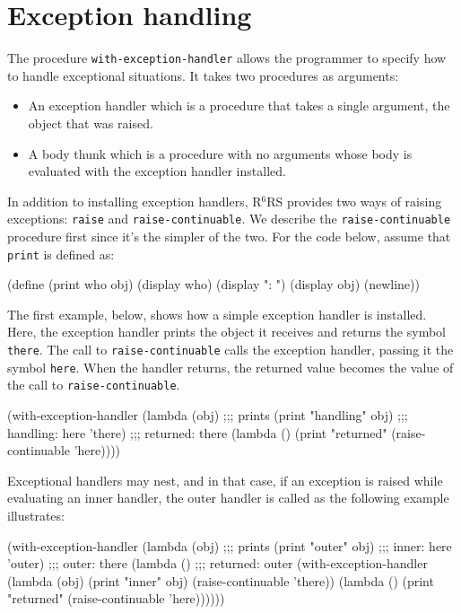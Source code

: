 \documentclass[onecolumn, 12pt, twoside, openright, dvipdfm]{book}
\newcommand{\rnrs}[1]{R$^{\mathrm{#1}}$RS}
\begin{document}
\section{Exception handling}

The procedure \texttt{with-exception-handler} allows the programmer
to specify how to handle exceptional situations.  It takes two
procedures as arguments: 
\begin{itemize}
\item An exception handler which is a procedure that takes a
single argument, the object that was raised.
\item A body thunk which is a procedure with no arguments whose body
is evaluated with the exception handler installed.
\end{itemize}

In addition to installing exception handlers, \rnrs{6} provides two
ways of raising exceptions: \texttt{raise} and
\texttt{raise-continuable}.  We describe the 
\texttt{raise-continuable} procedure
first since it's the simpler of the two.  
For the code below, assume that \texttt{print} is defined as:
\begin{CodeInline}
(define (print who obj)
  (display who) 
  (display ": ")
  (display obj)
  (newline))
\end{CodeInline}

The first example, below, shows how a simple exception handler is
installed.  Here, the exception handler prints the object it
receives and returns the symbol \texttt{there}.  The call to
\texttt{raise-continuable} calls the exception handler, passing it
the symbol \texttt{here}.  When the handler returns, the returned
value becomes the value of the call to \texttt{raise-continuable}.

\begin{CodeInline}
(with-exception-handler
  (lambda (obj)                         ;;; prints
    (print "handling" obj)              ;;;   handling: here
    'there)                             ;;;   returned: there
  (lambda ()
    (print "returned" (raise-continuable 'here))))
\end{CodeInline}

Exceptional handlers may nest, and in that case, if an exception is
raised while evaluating an inner handler, the outer handler is
called as the following example illustrates:

\begin{CodeInline}
(with-exception-handler
  (lambda (obj)                         ;;; prints
    (print "outer" obj)                 ;;;   inner: here    
    'outer)                             ;;;   outer: there   
  (lambda ()                            ;;;   returned: outer
    (with-exception-handler
      (lambda (obj)
        (print "inner" obj)
        (raise-continuable 'there))
      (lambda ()
        (print "returned" (raise-continuable 'here))))))
\end{CodeInline}
\end{document}
